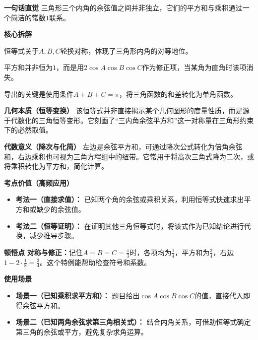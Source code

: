 \begin{explanationbox}
\textbf{\textcolor{CExplanation}{一句话直觉}}
三角形三个内角的余弦值之间并非独立，它们的平方和与乘积通过一个简洁的常数$1$联系。

\medskip
\textbf{\textcolor{CExplanation}{核心拆解}}
\begin{description}[style=nextline, leftmargin=2.8em, labelsep=0.5em, itemsep=0.45em]
    \item[\textbf{要点一（对称结构）：}] 恒等式关于$A,B,C$轮换对称，体现了三角形内角的对等地位。
    \item[\textbf{要点二（乘积修正）：}] 平方和并非恒为$1$，而是用$2\cos A\cos B\cos C$作为修正项，当某角为直角时该项消失。
    \item[\textbf{要点三（内角约束）：}] 导出的关键是使用条件$A+B+C=\pi$，将三角函数的和差转化为单角函数。
\end{description}

\medskip
\textbf{\textcolor{CExplanation}{几何本质（恒等变换）}}
该恒等式并非直接揭示某个几何图形的度量性质，而是源于代数化的三角恒等变形。它刻画了“三内角余弦平方和”这一对称量在三角形约束下的必然取值。

\medskip
\textbf{\textcolor{CExplanation}{代数意义（降次与化简）}}
左边是余弦平方和，可通过降次公式转化为倍角余弦和，右边乘积也可视为三角方程组中的纽带。它常用于将高次三角式降为二次，或将乘积转化为平方和，简化计算。

\medskip
\textbf{\textcolor{CExplanation}{考点价值（高频应用）}}
\begin{itemize}[leftmargin=*, itemsep=0.5em, topsep=0.4em]
    \item \textbf{考法一（直接求值）：} 已知两个角的余弦或乘积关系，利用恒等式快速求出平方和或缺少的余弦值。
    \item \textbf{考法二（恒等证明）：} 在证明其他三角恒等式时，将该式作为已知结论进行代换，减少推导步骤。
\end{itemize}

\medskip
\textbf{\textcolor{CExplanation}{顿悟点}}
\textbf{对称与修正：}记住$A=B=C=\frac{\pi}{3}$时，各项均为$\frac14$，平方和为$\frac34$，右边$1-2\cdot\frac18=\frac34$。这个特例能帮助检查符号和系数。

\medskip
\textbf{\textcolor{CExplanation}{使用场景}}
\begin{itemize}[leftmargin=*, itemsep=0.5em, topsep=0.4em]
    \item \textbf{场景一（已知乘积求平方和）：} 题目给出$\cos A\cos B\cos C$的值，直接代入即得余弦平方和。
    \item \textbf{场景二（已知两角余弦求第三角相关式）：} 结合内角关系，可借助恒等式确定第三角的余弦或平方，避免复杂求角运算。
\end{itemize}
\end{explanationbox}
